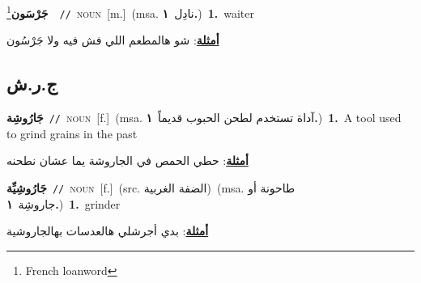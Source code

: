 \documentclass[10pt,a4paper,twoside]{article} %
\begin{document}
\begin{multicols}{2}
{\setlength\topsep{0pt}\textbf{\foreignlanguage{arabic}{جَرْسَون}}\footnote{French loanword}\ \ {\color{gray}\texttt{//}\color{black}}\ \textsc{noun}\ [m.]\ \color{gray}(msa. \foreignlanguage{arabic}{نادِل}~\foreignlanguage{arabic}{\textbf{١.}})\color{black}\ \textbf{1.}~waiter\  \begin{flushright}\color{gray}\foreignlanguage{arabic}{\textbf{\underline{\foreignlanguage{arabic}{أمثلة}}}: شو هالمطعم اللي فش فيه ولا جَرْسُون}\end{flushright}\color{black}} \vspace{2mm}

\vspace{-3mm}
\subsection*{\color{blue}\foreignlanguage{arabic}{ج.ر.ش}\color{blue}{}} 

{\setlength\topsep{0pt}\textbf{\foreignlanguage{arabic}{جَارُوشِة}}\ {\color{gray}\texttt{//}\color{black}}\ \textsc{noun}\ [f.]\ \color{gray}(msa. \foreignlanguage{arabic}{آداة تستخدم لطحن الحبوب قديماً}~\foreignlanguage{arabic}{\textbf{١.}})\color{black}\ \textbf{1.}~A tool used to grind grains in the past\  \begin{flushright}\color{gray}\foreignlanguage{arabic}{\textbf{\underline{\foreignlanguage{arabic}{أمثلة}}}: حطي الحمص في الجاروشة يما عشان نطحنه}\end{flushright}\color{black}} \vspace{2mm}

{\setlength\topsep{0pt}\textbf{\foreignlanguage{arabic}{جَارُوشِيِّة}}\ {\color{gray}\texttt{//}\color{black}}\ \textsc{noun}\ [f.]\ (src. \color{gray}\foreignlanguage{arabic}{الضفة الغربية}\color{black})\ \color{gray}(msa. \foreignlanguage{arabic}{طاحونة أو جاروشِة}~\foreignlanguage{arabic}{\textbf{١.}})\color{black}\ \textbf{1.}~grinder\  \begin{flushright}\color{gray}\foreignlanguage{arabic}{\textbf{\underline{\foreignlanguage{arabic}{أمثلة}}}: بدي أجرشلي هالعدسات بهالجاروشية}\end{flushright}\color{black}} \vspace{2mm}


\end{multicols}
\end{document}
